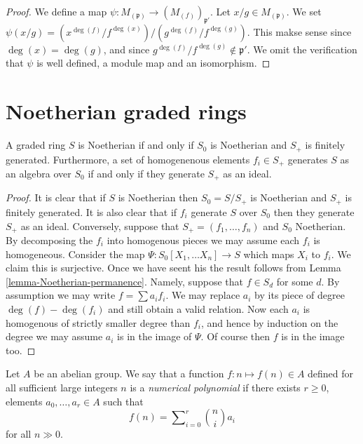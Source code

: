 \begin{proof}
We define a map $\psi : M_{(\mathfrak p)} \to (M_{(f)})_{\mathfrak p'}$.
Let $x/g \in M_{(\mathfrak p)}$. We set
$\psi(x/g) = (x^{\deg(f)}/f^{\deg(x)})/(g^{\deg(f)}/f^{\deg(g)})$.
This makse sense since $\deg(x) = \deg(g)$, and since
$g^{\deg(f)}/f^{\deg(g)} \not \in \mathfrak p'$.
We omit the verification that $\psi$ is well defined, a module map
and an isomorphism.
\end{proof}







\section{Noetherian graded rings}
\label{section-noetherian-graded}

\begin{lemma}
\label{lemma-graded-Noetherian}
A graded ring $S$ is Noetherian if and only if $S_0$ is 
Noetherian and $S_{+}$ is finitely generated. Furthermore,
a set of homogenenous elements $f_i \in S_{+}$ generates $S$
as an algebra over $S_0$ if and only if they generate
$S_{+}$ as an ideal.
\end{lemma}

\begin{proof}
It is clear that if $S$ is Noetherian then $S_0 = S/S_{+}$ is Noetherian
and $S_{+}$ is finitely generated. It is also clear that if
$f_i$ generate $S$ over $S_0$ then they generate $S_{+}$ as an
ideal. Conversely, suppose that
$S_{+} = (f_1, \ldots, f_n)$ and $S_0$ Noetherian.
By decomposing the $f_i$ into homogenous pieces we may assume each
$f_i$ is homogeneous. Consider the map
$\Psi : S_0[X_1,\ldots X_n] \to S$ which maps $X_i$ to $f_i$.
We claim this is surjective. Once we have seent his the result
follows from Lemma \ref{lemma-Noetherian-permanence}.
Namely, suppose that $f \in S_d$ for some $d$.
By assumption we may write $f = \sum a_i f_i$.
We may replace $a_i$ by its piece of degree $\deg(f) - \deg(f_i)$
and still obtain a valid relation. Now each $a_i$ is homogenous
of strictly smaller degree than $f_i$, and hence by induction
on the degree we may assume $a_i$ is in the image of $\Psi$.
Of course then $f$ is in the image too.
\end{proof}

\begin{definition}
\label{definition-numerical-polynomial}
Let $A$ be an abelian group.
We say that a function $f : n \mapsto f(n) \in A$
defined for all sufficient large integers $n$ is a
{\it numerical polynomial} if there exists $r \geq 0$,
elements $a_0,\ldots,a_r\in A$ such that
$$
f(n) = \sum\nolimits_{i=0}^r {n \choose i}a_i
$$
for all $n \gg 0$.
\end{definition}


